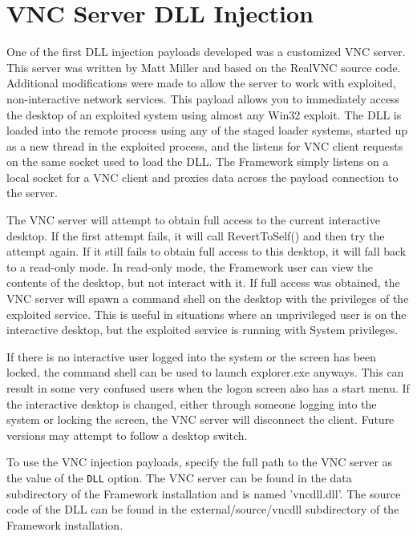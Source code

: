 \documentclass{report}
\begin{document}
\section{VNC Server DLL Injection}
\par
One of the first DLL injection payloads developed was a customized VNC server.
This server was written by Matt Miller and based on the RealVNC source code.
Additional modifications were made to allow the server to work with exploited,
non-interactive network services. This payload allows you to immediately access
the desktop of an exploited system using almost any Win32 exploit. The DLL is
loaded into the remote process using any of the staged loader systems, started
up as a new thread in the exploited process, and the listens for VNC client
requests on the same socket used to load the DLL. The Framework simply listens
on a local socket for a VNC client and proxies data across the payload
connection to the server.  

\par
The VNC server will attempt to obtain full access to the current interactive
desktop. If the first attempt fails, it will call RevertToSelf() and then try
the attempt again. If it still fails to obtain full access to this desktop, it
will fall back to a read-only mode. In read-only mode, the Framework user can
view the contents of the desktop, but not interact with it. If full access was
obtained, the VNC server will spawn a command shell on the desktop with the
privileges of the exploited service. This is useful in situations where an
unprivileged user is on the interactive desktop, but the exploited service is
running with System privileges.  

\par
If there is no interactive user logged into the system or the screen has been
locked, the command shell can be used to launch explorer.exe anyways. This can
result in some very confused users when the logon screen also has a start menu.
If the interactive desktop is changed, either through someone logging into the
system or locking the screen, the VNC server will disconnect the client. Future
versions may attempt to follow a desktop switch. 

\par
To use the VNC injection payloads, specify the full path to the VNC server as
the value of the \texttt{DLL} option. The VNC server can be found in the data
subdirectory of the Framework installation and is named 'vncdll.dll'. The source
code of the DLL can be found in the external/source/vncdll
subdirectory of the Framework installation. 
\end{document}
